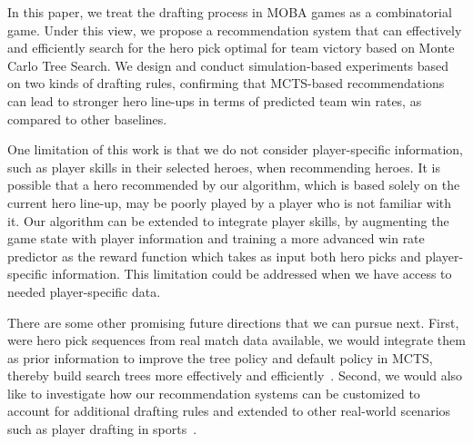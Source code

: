 In this paper, we treat the drafting process in MOBA games as a combinatorial game. Under this view, we propose a recommendation system that can effectively and efficiently search for the hero pick optimal for team victory based on Monte Carlo Tree Search. We design and conduct simulation-based experiments based on two kinds of drafting rules, confirming that MCTS-based recommendations can lead to stronger hero line-ups in terms of predicted team win rates, as compared to other baselines.

One limitation of this work is that we do not consider player-specific information, such as player skills in their selected heroes, when recommending heroes. It is possible that a hero recommended by our algorithm, which is based solely on the current hero line-up, may be poorly played by a player who is not familiar with it. Our algorithm can be extended to integrate player skills, by augmenting the game state with player information and training a more advanced win rate predictor as the reward function which takes as input both hero picks and player-specific information. This limitation could be addressed when we have access to needed player-specific data.

There are some other promising future directions that we can pursue next. First, were hero pick sequences from real match data available, we would integrate them as prior information to improve the tree policy and default policy in MCTS, thereby build search trees more effectively and efficiently~\cite{gelly2007combining,chaslot2009adding}. Second, we would also like to investigate how our recommendation systems can be customized to account for additional drafting rules and extended to other real-world scenarios such as player drafting in sports~\cite{staw1995sunk}. 
